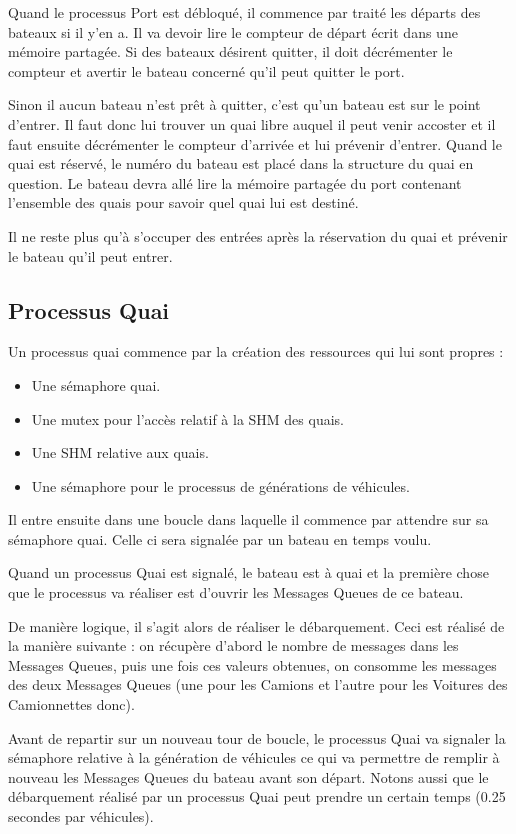 \documentclass[a4paper, 11pt]{article}
\begin{document}
		Quand le processus Port est débloqué, il commence par traité les départs des bateaux si il y'en a. Il va devoir lire le compteur de départ écrit dans une mémoire partagée. Si des bateaux désirent quitter, il doit décrémenter le compteur et avertir le bateau concerné qu'il peut quitter le port. 
		
		
		Sinon il aucun bateau n'est prêt à quitter, c'est qu'un bateau est sur le point d'entrer. Il faut donc lui trouver un quai libre auquel il peut venir accoster et il faut ensuite décrémenter le compteur d'arrivée et lui prévenir d'entrer. Quand le quai est réservé, le numéro du bateau est placé dans la structure du quai en question. Le bateau devra allé lire la mémoire partagée du port contenant l'ensemble des quais pour savoir quel quai lui est destiné.
		
		
		Il ne reste plus qu'à s'occuper des entrées après la réservation du quai et prévenir le bateau qu'il peut entrer.
			
	\subsection{Processus Quai}
		Un processus quai commence par la création des ressources qui lui sont propres : 
		\begin{itemize}
			\item Une sémaphore quai.
			\item Une mutex pour l'accès relatif à la SHM des quais.
			\item Une SHM relative aux quais.
			\item Une sémaphore pour le processus de générations de véhicules.
		\end{itemize}
		Il entre ensuite dans une boucle dans laquelle il commence par attendre sur sa sémaphore quai. Celle ci sera signalée par un bateau en temps voulu.
		
		Quand un processus Quai est signalé, le bateau est à quai et la première chose que le processus va réaliser est d'ouvrir les Messages Queues de ce bateau.
		
		De manière logique, il s'agit alors de réaliser le débarquement. Ceci est réalisé de la manière suivante : on récupère d'abord le nombre de messages dans les Messages Queues, puis une fois ces valeurs obtenues, on consomme les messages des deux Messages Queues (une pour les Camions et l'autre pour les Voitures des Camionnettes donc).
		
		
		Avant de repartir sur un nouveau tour de boucle, le processus Quai va signaler la sémaphore relative à la génération de véhicules ce qui va permettre de remplir à nouveau les Messages Queues du bateau avant son départ. Notons aussi que le débarquement réalisé par un processus Quai peut prendre un certain temps (0.25 secondes par véhicules).
		
		
\end{document}
